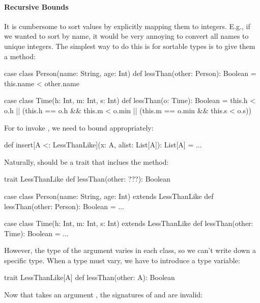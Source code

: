 \documentclass{book}
\begin{document}
\paragraph{Recursive Bounds}

It is cumbersome to sort values by explicitly mapping them to integers.
E.g., if we wanted to sort by name, it would be very annoying to convert
all names to unique integers. The simplest way to do this is for sortable
types is to give them a  method:

\begin{scalacode}
case class Person(name: String, age: Int) {
  def lessThan(other: Person): Boolean = this.name < other.name
}

case class Time(h: Int, m: Int, s: Int) {
  def lessThan(o: Time): Boolean = {
    this.h < o.h || (this.h == o.h && this.m < o.min || (this.m == o.min && this.s < o.s))
  }
}
\end{scalacode}

For  to invoke , we need to bound
 appropriately:

\begin{scalacode}
def insert[A <: LessThanLike](x: A, alist: List[A]): List[A] = ...
\end{scalacode}

Naturally,  should be a trait that inclues
the  method:
%
\begin{scalacode}
trait LessThanLike {
  def lessThan(other: ???): Boolean
}

case class Person(name: String, age: Int) extends LessThanLike {
  def lessThan(other: Person): Boolean = ...
}

case class Time(h: Int, m: Int, s: Int) extends LessThanLike {
  def lessThan(other: Time): Boolean = ...
}
\end{scalacode}

However, the type of the argument  varies in each class,
so we can't write down a specific type. When a type must vary, we have to introduce
a type variable:
%
\begin{scalacode}
trait LessThanLike[A] {
  def lessThan(other: A): Boolean
}
\end{scalacode}
%

Now that  takes an argument ,
the signatures of  and  are invalid:
\end{document}
